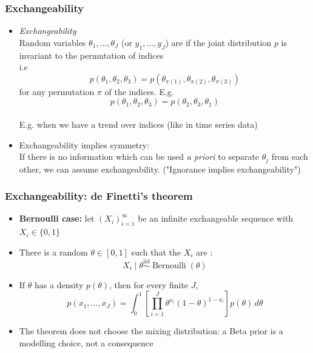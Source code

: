 \documentclass[10pt]{beamer}
\begin{document}
\begin{frame}

\frametitle{Exchangeability}

  \begin{itemize}
  \item \textit{Exchangeability} \\ Random variables
    $\theta_1,\ldots,\theta_J$ (or $y_1,\ldots,y_J$) are
     if the joint distribution $p$ is invariant to the
    permutation of indices\\
    i.e
    \begin{equation*}
      p(\theta_1,\theta_2,\theta_3) = p(\theta_{\pi(1)},\theta_{\pi(2)},\theta_{\pi(3)})
    \end{equation*}
    for any permutation $\pi$ of the indices. E.g.
    \begin{equation*}
      p(\theta_1,\theta_2,\theta_3) = p(\theta_2,\theta_3,\theta_1)
    \end{equation*}
\pause
   \\ \pause
  E.g. when we have a trend over indices (like in time series data)
\pause
  \item Exchangeability implies symmetry: \\If there is no information
    which can be used \textit{a priori} to separate $\theta_j$ from
    each other, we can assume exchangeability. ("Ignorance implies exchangeability")

  \end{itemize}
\end{frame}


\begin{frame}

\frametitle{Exchangeability: de Finetti's theorem}

  \begin{itemize}
  \item \textbf{Bernoulli case:} let $(X_i)_{i=1}^{\infty}$ be an
    infinite exchangeable sequence with $X_i\in\{0,1\}$
  \item There is a random $\theta\in[0,1]$ such that the $X_i$ are
    :
    \[
      X_i\mid\theta\overset{\mathrm{iid}}{\sim}
        \operatorname{Bernoulli}(\theta)
    \]
  \item If $\theta$ has a density $p(\theta)$, then for every finite $J$,
    \[
      p(x_1,\ldots,x_J)=\int_0^1
        \left[\prod_{i=1}^J\theta^{x_i}(1-\theta)^{1-x_i}\right]
        p(\theta)\,d\theta
    \]
  \item The theorem does not choose the mixing distribution:
    a Beta prior is a modelling choice, not a consequence
  \end{itemize}
\end{frame}
\end{document}
